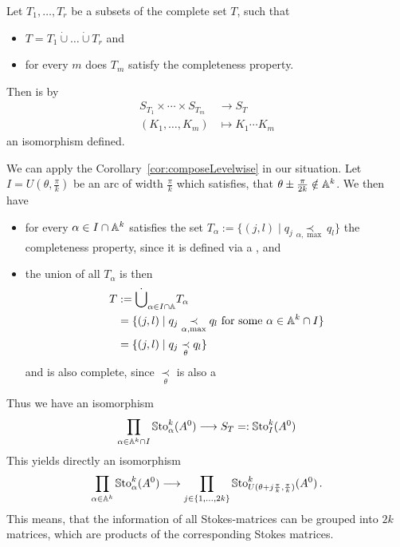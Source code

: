 \begin{cor}\label{cor:composeLevelwise}
  Let $T_1,\dots,T_r$ be a subsets of the complete set $T$, such that
  \begin{itemize}
    \item $T=T_1\dot\cup\dots\dot\cup T_r$ and
    \item for every $m$ does $T_m$ satisfy the completeness property.
  \end{itemize}
  Then is by
  \begin{align*}
    S_{T_1}\times\cdots\times S_{T_m} &\longrightarrow S_T
  \\(K_1,\dots,K_m) &\longmapsto K_1\cdots K_m
  \end{align*}
  an isomorphism defined.
\end{cor}
We can apply the Corollary~\ref{cor:composeLevelwise} in our situation. Let
$I=U(\theta,\frac{\pi}{k})$ be an arc of width $\frac{\pi}{k}$ which satisfies,
that $\theta\pm\frac{\pi}{2k}\notin\mathbb{A}^k$.
We then have
\begin{itemize}
  \item for every $\alpha\in I\cap \mathbb{A}^k$ satisfies the set
    $T_{\alpha}:=\{(j,l)\mid q_j\underset{\alpha,\max}{\prec}q_l\}$
    the completeness property, since it is defined via a , and
  \item the union of all $T_{\alpha}$ is then
    \begin{align*}
      T&:=\dot\bigcup_{\alpha\in I\cap\mathbb{A}}T_{\alpha}
      \\&=\{(j,l) \mid q_j \underset{\alpha,\max}{\prec} q_l
          \text{~for some~}\alpha\in\mathbb{A}^k\cap I \}
      \\&=\{(j,l) \mid q_j \underset{\theta}{\prec} q_l \}
    \end{align*}
    and is also complete, since $\underset{\theta}{\prec}$ is also a
\end{itemize}
Thus we have an isomorphism
\[
  \prod_{\alpha\in\mathbb{A}^k\cap I}\operatorname{\mathbb{S}to}_\alpha^k(A^0)
  \longrightarrow
  S_T=:\operatorname{\mathbb{S}to}_I^k(A^0)
\]
This yields directly an isomorphism
\[
  \prod_{\alpha\in\mathbb{A}^k}\operatorname{\mathbb{S}to}_\alpha^k(A^0)
  \longrightarrow
  \prod_{j\in\{1,\dots,2k\}}
  \operatorname{\mathbb{S}to}_{U(\theta+j\frac{\pi}{k},\frac{\pi}{k})}^k(A^0) \,.
\]
This means, that the information of all Stokes-matrices can be grouped into
$2k$ matrices, which are products of the corresponding Stokes matrices.

